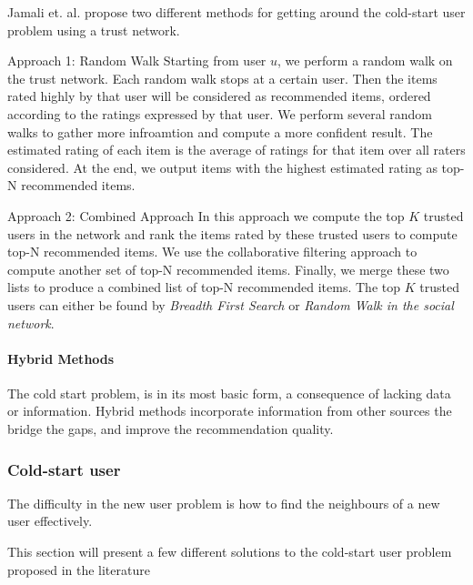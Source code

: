 
Jamali et. al. \cite{Jamali2009} propose two different methods for getting around the cold-start user problem using a trust network.

Approach 1: Random Walk
Starting from user $u$, we perform a random walk on the trust network. Each random walk stops at a certain user. Then the items rated highly by that user will be considered as recommended items, ordered according to the ratings expressed by that user. We perform several random walks to gather more infroamtion and compute a more confident result. The estimated rating of each item is the average of ratings for that item over all raters considered. At the end, we output items with the highest estimated rating as top-N recommended items.

Approach 2: Combined Approach
In this approach we compute the top $K$ trusted users in the network and rank the items rated by these trusted users to compute top-N recommended items. We use the collaborative filtering approach to compute another set of top-N recommended items. Finally, we merge these two lists to produce a combined list of top-N recommended items. The top $K$ trusted users can either be found by \emph{Breadth First Search} or \emph{Random Walk in the social network}.


\paragraph{Hybrid Methods}

The cold start problem, is in its most basic form, a consequence of lacking data or information. Hybrid methods incorporate information from other sources the bridge the gaps, and improve the recommendation quality.

\subsubsection{Cold-start user}


The difficulty in the new user problem is how to find the neighbours of a new user effectively.

This section will present a few different solutions to the cold-start user problem proposed in the literature

